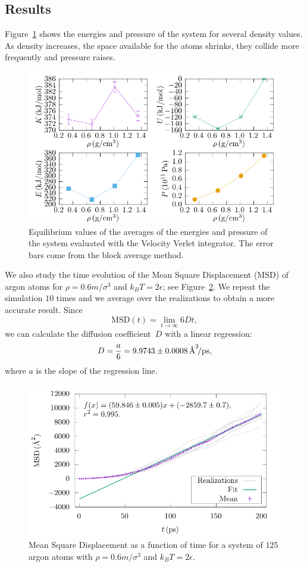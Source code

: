 \documentclass{article}
\begin{document}
  \subsection{Results}

  Figure~\ref{fig:liquid} shows the energies and pressure of the system for several density values. As density increases, the space available for the atoms shrinks, they collide more frequently and pressure raises.
  \begin{figure}[htb]
    \centering
    \includegraphics[width=\linewidth]{../figures/liquid_quantities.pdf}
    \caption{Equilibrium values of the averages of the energies and pressure of the system evaluated with the Velocity Verlet integrator. The error bars come from the block average method.}\label{fig:liquid}
  \end{figure}

  We also study the time evolution of the Mean Square Displacement (MSD) of argon atoms for \(\rho=0.6m/\sigma^{3}\) and \(k_{B}T=2\epsilon\); see Figure~\ref{fig:msd}. We repeat the simulation \(10\) times and we average over the realizations to obtain a more accurate result. Since
  \[
    \text{MSD}(t)=\lim_{t\to\infty}6Dt,
  \]
  we can calculate the diffusion coefficient~\(D\) with a linear regression:
  \[
    D=\frac{a}{6}=9.9743\pm0.0008\,\textup{\AA}^{2}\!/\mathrm{ps},
  \]
  where \(a\) is the slope of the regression line.
  \begin{figure}[htb]
    \centering
    \includegraphics[width=\linewidth]{../figures/msd.pdf}
    \caption{Mean Square Displacement as a function of time for a system of \(125\) argon atoms with \(\rho=0.6m/\sigma^{3}\) and \(k_{B}T=2\epsilon\).}\label{fig:msd}
  \end{figure}
\end{document}
